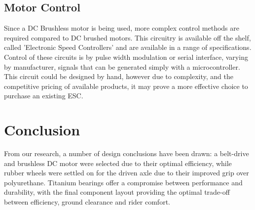 \documentclass[journal,10pt]{IEEEtran}
\begin{document}
    \subsection{Motor Control}
    		Since a DC Brushless motor is being used, more complex control methods are required compared to DC brushed motors.
    		This circuitry is available off the shelf, called 'Electronic Speed Controllers' and are available in a range of specifications.
    		Control of these circuits is by pulse width modulation or serial interface, varying by manufacturer, signals that can be generated simply with a microcontroller.
    		This circuit could be designed by hand, however due to complexity, and the competitive pricing of available products, it may prove a more effective choice to purchase an existing ESC.
\section{Conclusion}
From our research, a number of design conclusions have been drawn: a belt-drive and brushless DC motor were selected due to their optimal efficiency, while rubber wheels were settled on for the driven axle due to their improved grip over polyurethane. Titanium bearings offer a compromise between performance and durability, with the final component layout providing the optimal trade-off between efficiency, ground clearance and rider comfort.



\end{document}
